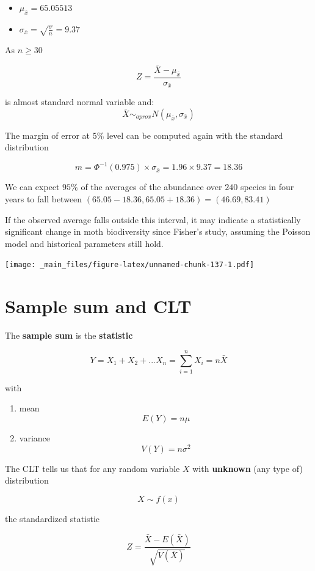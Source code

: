 \documentclass[
]{book}
\providecommand{\tightlist}{%
  \setlength{\itemsep}{0pt}\setlength{\parskip}{0pt}}
\begin{document}
\begin{itemize}
\tightlist
\item
  \(\mu_{\bar{x}}=65.05513\)
\item
  \(\sigma_{\bar{x}}=\sqrt{\frac{\sigma}{n}}=9.37\)
\end{itemize}

As \(n \geq 30\)

\[Z=\frac{\bar{X}-\mu_{\bar{x}}}{\sigma_{\bar{x}}}\]

is almost standard normal variable and: \[\bar{X} \sim_{aprox}  N(\mu_{\bar{x}}, \sigma_{\bar{x}})\]

The margin of error at \(5\%\) level can be computed again with the standard distribution

\[m=\Phi^{-1}(0.975)\times \sigma_{\bar{x}}=1.96\times 9.37=18.36\]

We can expect \(95\%\) of the averages of the abundance over \(240\) species in four years to fall between
\((65.05-18.36, 65.05+18.36)= (46.69, 83.41)\)

If the observed average falls outside this interval, it may indicate a statistically significant change in moth biodiversity since Fisher's study, assuming the Poisson model and historical parameters still hold.

\texttt{[image: \_main\_files/figure-latex/unnamed-chunk-137-1.pdf]}

\hypertarget{sample-sum-and-clt}{%
\section{Sample sum and CLT}\label{sample-sum-and-clt}}

The \textbf{sample sum} is the \textbf{statistic}

\[Y=X_1+X_2+...X_n=\sum_{i=1}^n X_i=n \bar{X}\]

with

\begin{enumerate}
\def\labelenumi{\arabic{enumi})}
\tightlist
\item
  mean \[E(Y)=n\mu\]
\item
  variance \[V(Y)=n\sigma^2\]
\end{enumerate}

The CLT tells us that for any random variable \(X\) with \textbf{unknown} (any type of) distribution

\[X \sim f(x)\]

the standardized statistic

\[Z=\frac{\bar{X}-E(\bar{X})}{\sqrt{V(\bar{X})}}\]
\end{document}
